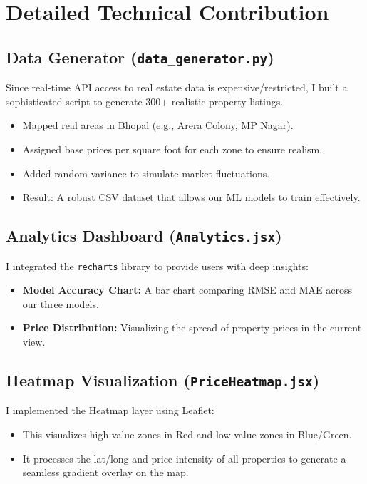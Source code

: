 \documentclass[12pt, a4paper]{article}
\begin{document}
\section{Detailed Technical Contribution}

\subsection{Data Generator (\texttt{data\_generator.py})}
Since real-time API access to real estate data is expensive/restricted, I built a sophisticated script to generate 300+ realistic property listings.
\begin{itemize}
    \item Mapped real areas in Bhopal (e.g., Arera Colony, MP Nagar).
    \item Assigned base prices per square foot for each zone to ensure realism.
    \item Added random variance to simulate market fluctuations.
    \item Result: A robust CSV dataset that allows our ML models to train effectively.
\end{itemize}

\subsection{Analytics Dashboard (\texttt{Analytics.jsx})}
I integrated the \texttt{recharts} library to provide users with deep insights:
\begin{itemize}
    \item \textbf{Model Accuracy Chart:} A bar chart comparing RMSE and MAE across our three models.
    \item \textbf{Price Distribution:} Visualizing the spread of property prices in the current view.
\end{itemize}

\subsection{Heatmap Visualization (\texttt{PriceHeatmap.jsx})}
I implemented the Heatmap layer using Leaflet:
\begin{itemize}
    \item This visualizes high-value zones in Red and low-value zones in Blue/Green.
    \item It processes the lat/long and price intensity of all properties to generate a seamless gradient overlay on the map.
\end{itemize}
\end{document}
